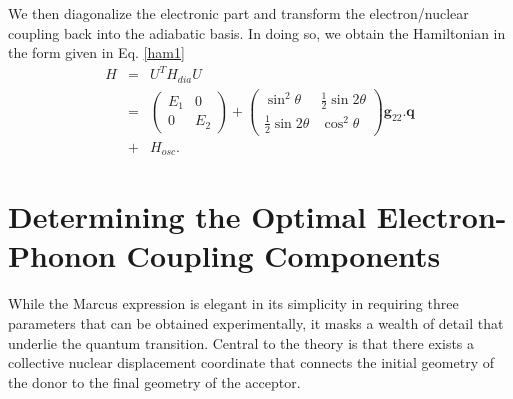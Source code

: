 We then diagonalize the electronic part and transform the electron/nuclear coupling
back into the adiabatic basis.  In doing so,  we obtain the Hamiltonian in the
form given in Eq. \ref{ham1}
\begin{eqnarray}
H&=&U^{T}H_{dia}U\nonumber  \\
&=&\left(\begin{array}{cc}
E_{1}  & 0 \\
0 & E_{2}
\end{array}\right)+\left(\begin{array}{cc}
\sin^{2}\theta & \frac{1}{2}\sin2\theta\\
\frac{1}{2}\sin2\theta & \cos^{2}\theta
\end{array}\right) {\mathbf g}_{22}.{\mathbf q} \nonumber \\
&+& H_{osc}.\label{eq:locaiHam}
\end{eqnarray}







\section{Determining the Optimal Electron-Phonon Coupling Components}

While the Marcus expression is elegant in its simplicity in requiring three parameters that
can be obtained experimentally, it masks a wealth of detail that underlie the quantum transition.
Central to the theory is that there exists a collective nuclear displacement coordinate
that connects the initial geometry of the donor to the final geometry of the acceptor.

